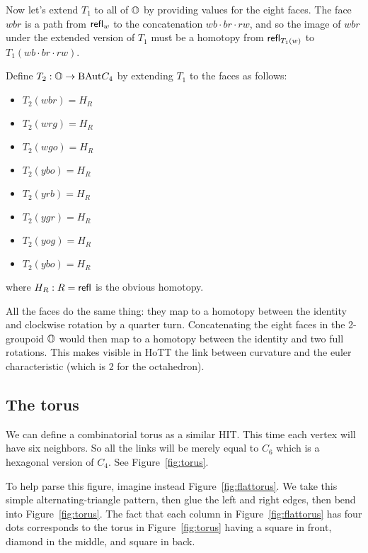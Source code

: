 Now let's extend \( T_1 \) to all of \( \mathbb{O} \) by providing values for the eight faces. The face \( wbr \) is a path from \( \mathsf{refl}_w \) to the concatenation \( wb\cdot br\cdot rw \), and so the image of \( wbr \) under the extended version of \( T_1 \) must be a homotopy from \( \mathsf{refl}_{T_1(w)} \) to \( T_1(wb\cdot br\cdot rw) \).

\begin{mydef}
Define \( T_2:\mathbb{O}\to\mathrm{BAut} C_4 \) by extending \( T_1 \) to the faces as follows:
\begin{itemize}
\item \( T_2(wbr)=H_R \) 
\item \( T_2(wrg)=H_R \)
\item \( T_2(wgo)=H_R \)
\item \( T_2(ybo)=H_R \)
\item \( T_2(yrb)=H_R \) 
\item \( T_2(ygr)=H_R \)
\item \( T_2(yog)=H_R \)
\item \( T_2(ybo)=H_R \)
\end{itemize}
where \( H_R:R=\mathsf{refl} \) is the obvious homotopy.
\end{mydef}

All the faces do the same thing: they map to a homotopy between the identity and clockwise rotation by a quarter turn. Concatenating the eight faces in the 2-groupoid \( \mathbb{O} \) would then map to a homotopy between the identity and two full rotations. This makes visible in HoTT the link between curvature and the euler characteristic (which is 2 for the octahedron).

\subsection{The torus}

We can define a combinatorial torus as a similar HIT. This time each vertex will have six neighbors. So all the links will be merely equal to \( C_6 \) which is a hexagonal version of \( C_4 \). See Figure~\ref{fig:torus}. 

To help parse this figure, imagine instead Figure~\ref{fig:flattorus}. We take this simple alternating-triangle pattern, then glue the left and right edges, then bend into Figure~\ref{fig:torus}. The fact that each column in Figure~\ref{fig:flattorus} has four dots corresponds to the torus in Figure~\ref{fig:torus} having a square in front, diamond in the middle, and square in back.


